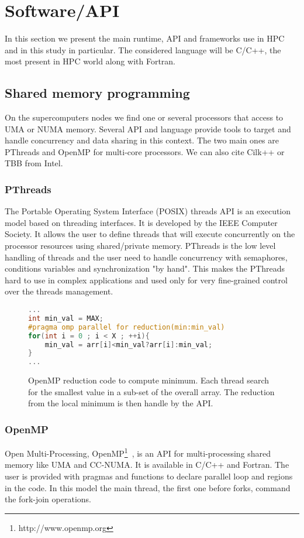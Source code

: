 \section{Software/API}
In this section we present the main runtime, API and frameworks use in HPC and in this study in particular. 
The considered language will be C/C++, the most present in HPC world along with Fortran. 

\subsection{Shared memory programming}
On the supercomputers nodes we find one or several processors that access to UMA or NUMA memory. 
Several API and language provide tools to target and handle concurrency and data sharing in this context. 
The two main ones are PThreads and OpenMP for multi-core processors. 
We can also cite Cilk++ or TBB from Intel.

\subsubsection{PThreads}
The Portable Operating System Interface (POSIX) threads API is an execution model based on threading interfaces. 
It is developed by the IEEE Computer Society. 
It allows the user to define threads that will execute concurrently on the processor resources using shared/private memory.
PThreads is the low level handling of threads and the user need to handle concurrency with semaphores, conditions variables and synchronization "by hand".
This makes the PThreads hard to use in complex applications and used only for very fine-grained control over the threads management. 

\begin{figure}[t!]
\begin{lstlisting}[language=C]
...
int min_val = MAX;
#pragma omp parallel for reduction(min:min_val)
for(int i = 0 ; i < X ; ++i){
	min_val = arr[i]<min_val?arr[i]:min_val;
}
...
\end{lstlisting}
\caption[OpenMP Reduction code]{OpenMP reduction code to compute minimum. Each thread search for the smallest value in a sub-set of the overall array. The reduction from the local minimum is then handle by the API.}
\label{code:openmp_reduction}
\end{figure}


\subsubsection{OpenMP}
Open Multi-Processing, OpenMP\footnote{http://www.openmp.org}~\cite{chapman2008using,supinski2017scaling,CDK+00}, is an API for multi-processing shared memory like UMA and CC-NUMA.
It is available in C/C++ and Fortran.
The user is provided with pragmas and functions to declare parallel loop and regions in the code. 
In this model the main thread, the first one before forks, command the fork-join operations. 

